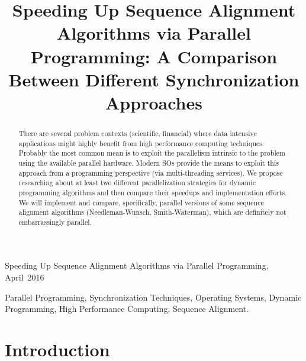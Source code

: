 \documentclass[journal]{IEEEtran}
\begin{document}
\title{Speeding Up Sequence Alignment Algorithms via Parallel Programming: A Comparison Between Different Synchronization Approaches}

\author{
}

%
{Speeding Up Sequence Alignment Algorithms via Parallel Programming, April~2016}

\maketitle

\begin{abstract}
	There are several problem contexts (scientific, financial) where data intensive applications might highly benefit from high performance computing techniques. Probably the most common mean is to exploit the parallelism intrinsic to the problem using the available parallel hardware. Modern SOs provide the means to exploit this approach from a programming perspective (via multi-threading services). We propose researching about at least two different parallelization strategies for dynamic programming algorithms and then compare their speedups and implementation efforts. We will implement and compare, specifically, parallel versions of some sequence alignment algorithms (Needleman-Wunsch, Smith-Waterman), which are definitely not embarrassingly parallel.
\end{abstract}


\begin{IEEEkeywords}
	Parallel Programming, Synchronization Techniques, Operating Systems, Dynamic Programming, High Performance Computing, Sequence Alignment.
\end{IEEEkeywords}

\section{Introduction}
\end{document}
